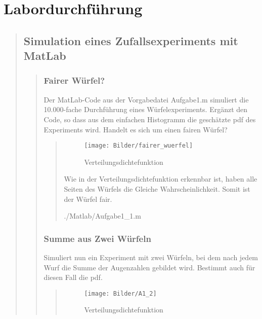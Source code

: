 \section{Labordurchführung}
\begin{quote}
    
    \subsection{Simulation eines Zufallsexperiments mit MatLab}
    \begin{quote}
        
        \subsubsection{Fairer Würfel?}
        Der MatLab-Code aus der Vorgabedatei Aufgabe1.m simuliert die 10.000-fache Durchführung eines Würfelexperiments. Ergänzt
        den Code, so dass aus dem einfachen Histogramm die geschätzte pdf des Experiments wird. Handelt es sich um einen fairen
        Würfel?
        
        \begin{quote}
            \begin{figure}[H]
            \centering
                \texttt{[image: Bilder/fairer\_wuerfel]}
                    \caption{Verteilungsdichtefunktion}
                    \label{fig:fairer_wuerfel}
            \end{figure}
            
            Wie in der Verteilungsdichtefunktion erkennbar ist, haben alle Seiten des Würfels die Gleiche Wahrscheinlichkeit.
            Somit ist der Würfel fair.
            
            
                {./Matlab/Aufgabe1_1.m}
                
        \end{quote}
        
        
        \subsubsection{Summe aus Zwei Würfeln}
        Simuliert nun ein Experiment mit zwei Würfeln, bei dem nach jedem Wurf die Summe der Augenzahlen gebildet wird. Bestimmt
        auch für diesen Fall die pdf.
        
        \begin{quote}
            \begin{figure}[H]
            \centering
                \texttt{[image: Bilder/A1\_2]}
                    \caption{Verteilungsdichtefunktion}
                    \label{fig:A1_2}
            \end{figure}
            

\end{quote}
\end{quote}
\end{quote}
